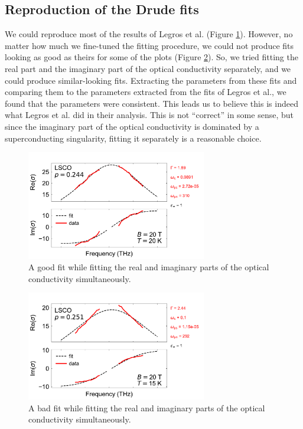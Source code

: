 \subsection{Reproduction of the Drude fits}
We could reproduce most of the results of Legros et al. (Figure \ref{fig:drude_fit_good}).
However, no matter how much we fine-tuned the fitting procedure, we could not produce fits looking
as good as theirs for some of the plots (Figure \ref{fig:drude_fit_bad}). So, we tried fitting the
real part and the imaginary part of the optical conductivity separately, and we could produce
similar-looking fits. Extracting the parameters from these fits and comparing them to the parameters
extracted from the fits of Legros et al., we found that the parameters were consistent. This leads
us to believe this is indeed what Legros et al. did in their analysis. This is not ``correct'' in
some sense, but since the imaginary part of the optical conductivity is dominated by a
superconducting singularity, fitting it separately is a reasonable choice.

\begin{figure}
    \centering
    \includegraphics[width=0.7\textwidth]{figures/drude_fit_good.pdf}
    \caption{A good fit while fitting the real and imaginary parts of the optical conductivity
        simultaneously.}
    \label{fig:drude_fit_good}
\end{figure}
\begin{figure}
    \centering
    \includegraphics[width=0.7\textwidth]{figures/drude_fit_bad.pdf}
    \caption{A bad fit while fitting the real and imaginary parts of the optical conductivity
        simultaneously.}
    \label{fig:drude_fit_bad}
\end{figure}